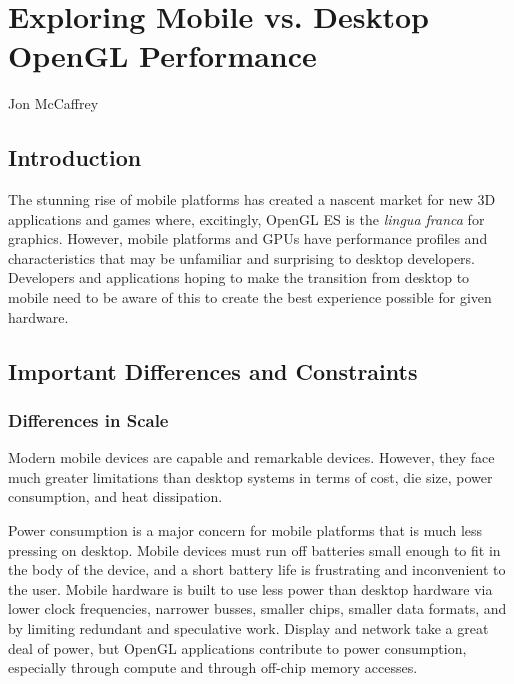\chapter{Exploring Mobile vs. Desktop OpenGL Performance}{Jon McCaffrey}
\label{Exploring-Mobile-vs-Desktop-OpenGL-Performance}

\section{Introduction}

The stunning rise of mobile platforms has created a nascent market for new 3D
applications and games where, excitingly, OpenGL ES is the \textit{lingua
franca} for graphics. However, mobile platforms and GPUs have performance
profiles and characteristics that may be unfamiliar and surprising to desktop
developers.  Developers and applications hoping to make the transition from
desktop to mobile need to be aware of this to create the best experience
possible for given hardware.

\section{Important Differences and Constraints}\label{Jon-McCaffrey:Constraints-Inspire-Creativity}

\subsection{Differences in Scale}
\label{Jon-McCaffrey:Architectural-Differences} Modern mobile devices are
capable and remarkable devices.  However, they face much greater limitations
than desktop systems in terms of cost, die size, power consumption, and heat
dissipation.

Power consumption is a major concern for mobile platforms that is much less
pressing on desktop.  Mobile devices must run off batteries small enough to fit
in the body of the device, and a short battery life is frustrating and
inconvenient to the user.  Mobile hardware is built to use less power than
desktop hardware via lower clock frequencies, narrower busses, smaller chips,
smaller data formats, and by limiting redundant and speculative work.  Display
and network take a great deal of power, but OpenGL applications contribute to
power consumption, especially through compute and through off-chip memory
accesses.

